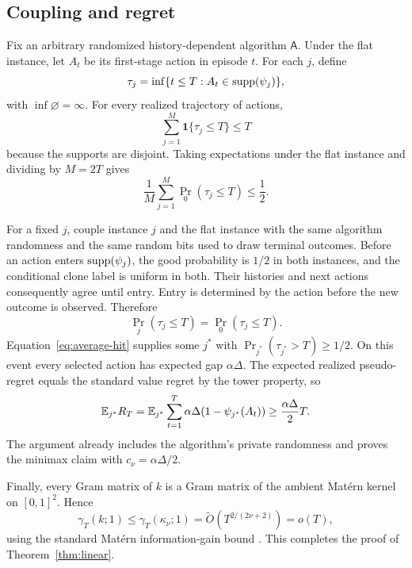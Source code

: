 \subsection{Coupling and regret}

Fix an arbitrary randomized history-dependent algorithm $\mathsf A$. Under the flat
instance, let $A_t$ be its first-stage action in episode $t$. For each $j$, define
\begin{equation}
 \tau_j=\inf\{t\leq T:A_t\in\operatorname{supp}(\psi_j)\},
\end{equation}
with $\inf\varnothing=\infty$. For every realized trajectory of actions,
\begin{equation}
 \sum_{j=1}^{M}\mathbf 1\{\tau_j\leq T\}\leq T
 \label{eq:path-hit-count}
\end{equation}
because the supports are disjoint. Taking expectations under the flat instance
and dividing by $M=2T$ gives
\begin{equation}
 \frac1M\sum_{j=1}^M\Pr_0(\tau_j\leq T)\leq\frac12.
 \label{eq:average-hit}
\end{equation}

For a fixed $j$, couple instance $j$ and the flat instance with the same algorithm
randomness and the same random bits used to draw terminal outcomes. Before an
action enters $\operatorname{supp}(\psi_j)$, the good probability is $1/2$ in both instances,
and the conditional clone label is uniform in both. Their histories and next
actions consequently agree until entry. Entry is determined by the action before
the new outcome is observed. Therefore
\begin{equation}
 \Pr_j(\tau_j\leq T)=\Pr_0(\tau_j\leq T).
 \label{eq:hitting-coupling}
\end{equation}
Equation~\eqref{eq:average-hit} supplies some $j^*$ with
$\Pr_{j^*}(\tau_{j^*}>T)\geq1/2$. On this event every selected action has expected
gap $\alpha\Delta$. The expected realized pseudo-regret equals the standard
value regret by the tower property, so
\begin{equation}
 \mathbb E_{j^*}R_T
 =\mathbb E_{j^*}\sum_{t=1}^T\alpha\Delta(1-\psi_{j^*}(A_t))
 \geq\frac{\alpha\Delta}{2}T.
 \label{eq:lower-complete}
\end{equation}
The argument already includes the algorithm's private randomness and proves the
minimax claim with $c_\nu=\alpha\Delta/2$.

Finally, every Gram matrix of $k$ is a Gram matrix of the ambient Mat\'ern kernel on
$[0,1]^2$. Hence
\begin{equation}
 \gamma_T(k;1)\leq\gamma_T(\kappa_\nu;1)
 =\widetilde O\!\left(T^{2/(2\nu+2)}\right)=o(T),
\end{equation}
using the standard Mat\'ern information-gain bound
\citep{vakili2021information}. This completes the proof of
Theorem~\ref{thm:linear}.

